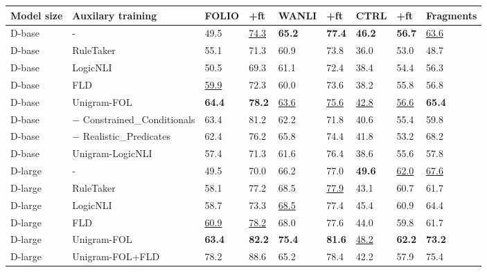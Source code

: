
\begin{tabular}{lllllllll}
\toprule
Model size & Auxilary training & FOLIO & +ft & WANLI & +ft & CTRL & +ft & Fragments \\
\midrule
D-base & - & 49.5 & \underline{74.3} & \textbf{65.2} & \textbf{77.4} & \textbf{46.2} & \textbf{56.7} & \underline{63.6} \\
D-base & RuleTaker & 55.1 & 71.3 & 60.9 & 73.8 & 36.0 & 53.0 & 48.7 \\
D-base & LogicNLI & 50.5 & 69.3 & 61.1 & 72.4 & 38.4 & 54.4 & 56.3 \\
D-base & FLD & \underline{59.9} & 72.3 & 60.0 & 73.6 & 38.2 & 55.8 & 56.8 \\
D-base & Unigram-FOL & \textbf{64.4} & \textbf{78.2} & \underline{63.6} & \underline{75.6} & \underline{42.8} & \underline{56.6} & \textbf{65.4} \\
\midrule
D-base & $\minus$ Constrained\_Conditionals & 63.4 & 81.2 & 62.2 & 71.8 & 40.6 & 55.4 & 59.8 \\
D-base & $\minus$ Realistic\_Predicates & 62.4 & 76.2 & 65.8 & 74.4 & 41.8 & 53.2 & 68.2 \\
D-base & Unigram-LogicNLI & 57.4 & 71.3 & 61.6 & 76.4 & 38.6 & 55.6 & 57.8 \\
\midrule
D-large & - & 49.5 & 70.0 & 66.2 & 77.0 & \textbf{49.6} & \underline{62.0} & \underline{67.6} \\
D-large & RuleTaker & 58.1 & 77.2 & 68.5 & \underline{77.9} & 43.1 & 60.7 & 61.7 \\
D-large & LogicNLI & 58.7 & 73.3 & \underline{68.5} & 77.4 & 45.4 & 60.9 & 64.4 \\
D-large & FLD & \underline{60.9} & \underline{78.2} & 68.0 & 77.6 & 44.0 & 59.8 & 61.7 \\
D-large & Unigram-FOL & \textbf{63.4} & \textbf{82.2} & \textbf{75.4} & \textbf{81.6} & \underline{48.2} & \textbf{62.2} & \textbf{73.2} \\
\midrule
D-large & Unigram-FOL+FLD & 78.2 & 88.6 & 65.2 & 78.4 & 42.2 & 57.9 & 75.4 \\
\bottomrule
\end{tabular}


